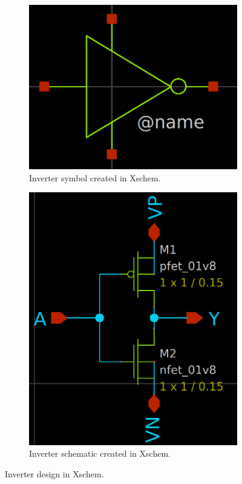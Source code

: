 \documentclass[11pt]{article}
\begin{document}
    \begin{figure}[!ht]
        \begin{subfigure}{0.5\linewidth}
            \includegraphics[width=\linewidth]{inverter_sym.png}
            \caption{Inverter symbol created in Xschem.}
        \end{subfigure}
        \begin{subfigure}{0.5\linewidth}
            \includegraphics[width=\linewidth]{inverter_sch.png}
            \caption{Inverter schematic created in Xschem.}
        \end{subfigure}
        \caption{Inverter design in Xschem.}
        \label{fig:inv}
    \end{figure}
\end{document}
